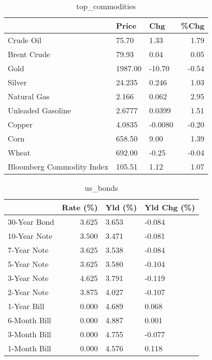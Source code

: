 \documentclass{article}%
\begin{document}
\begin{table}[htbp]%
\caption{top\_commodities}%
\centering%
\begin{adjustbox}{width=1\textwidth}%
\begin{tabular}{lllr}
\toprule
                          &   Price &     Chg &  \%Chg \\
\midrule
               Crude Oil  &   75.70 &    1.33 &  1.79 \\
             Brent Crude  &   79.93 &    0.04 &  0.05 \\
                    Gold  & 1987.00 &  -10.70 & -0.54 \\
                  Silver  &  24.235 &   0.246 &  1.03 \\
             Natural Gas  &   2.166 &   0.062 &  2.95 \\
       Unleaded Gasoline  &  2.6777 &  0.0399 &  1.51 \\
                  Copper  &  4.0835 & -0.0080 & -0.20 \\
                    Corn  &  658.50 &    9.00 &  1.39 \\
                   Wheat  &  692.00 &   -0.25 & -0.04 \\
Bloomberg Commodity Index &  105.51 &    1.12 &  1.07 \\
\bottomrule
\end{tabular}
%
\end{adjustbox}%
\end{table}

%


\begin{table}[htbp]%
\caption{us\_bonds}%
\centering%
\begin{adjustbox}{width=1\textwidth}%
\begin{tabular}{lrll}
\toprule
             &  Rate (\%) & Yld (\%) & Yld Chg (\%) \\
\midrule
30-Year Bond &     3.625 &   3.653 &      -0.084 \\
10-Year Note &     3.500 &   3.471 &      -0.081 \\
 7-Year Note &     3.625 &   3.538 &      -0.084 \\
 5-Year Note &     3.625 &   3.580 &      -0.104 \\
 3-Year Note &     4.625 &   3.791 &      -0.119 \\
 2-Year Note &     3.875 &   4.027 &      -0.107 \\
 1-Year Bill &     0.000 &   4.689 &       0.068 \\
6-Month Bill &     0.000 &   4.887 &       0.001 \\
3-Month Bill &     0.000 &   4.755 &      -0.077 \\
1-Month Bill &     0.000 &   4.576 &       0.118 \\
\bottomrule
\end{tabular}
%
\end{adjustbox}%
\end{table}
\end{document}
